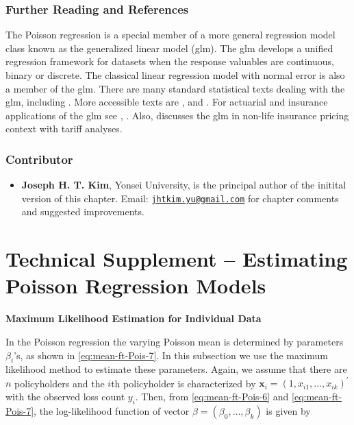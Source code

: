 \documentclass[]{book}
\providecommand{\tightlist}{%
  \setlength{\itemsep}{0pt}\setlength{\parskip}{0pt}}
\theoremstyle{definition}
\theoremstyle{definition}
\theoremstyle{definition}
\theoremstyle{remark}
\begin{document}
\subsubsection*{Further Reading and
References}\label{further-reading-and-references}

The Poisson regression is a special member of a more general regression
model class known as the generalized linear model (glm). The glm
develops a unified regression framework for datasets when the response
valuables are continuous, binary or discrete. The classical linear
regression model with normal error is also a member of the glm. There
are many standard statistical texts dealing with the glm, including
\citep{mccullagh1989generalized}. More accessible texts are
\citep{dobson2008introduction}, \citep{agresti1996introduction} and
\citep{faraway2016extending}. For actuarial and insurance applications
of the glm see \citep{frees2009regression}, \citep{de2008generalized}.
Also, \citep{ohlsson2010non} discusses the glm in non-life insurance
pricing context with tariff analyses.

\subsubsection*{Contributor}\label{contributor-1}

\begin{itemize}
\tightlist
\item
  \textbf{Joseph H. T. Kim}, Yonsei University, is the principal author
  of the initital version of this chapter. Email:
  \href{mailto:jhtkim.yu@gmail.com}{\nolinkurl{jhtkim.yu@gmail.com}} for
  chapter comments and suggested improvements.
\end{itemize}

\section{Technical Supplement -- Estimating Poisson Regression
Models}\label{S:RC:mle-Pois-reg}

\textbf{Maximum Likelihood Estimation for Individual Data}

In the Poisson regression the varying Poisson mean is determined by
parameters \(\beta_i\)'s, as shown in \eqref{eq:mean-ft-Pois-7}. In this
subsection we use the maximum likelihood method to estimate these
parameters. Again, we assume that there are \(n\) policyholders and the
\(i\)th policyholder is characterized by
\(\mathbf{ x}_i=(1, x_{i1}, \ldots, x_{ik})^{\prime}\) with the observed
loss count \(y_i\). Then, from \eqref{eq:mean-ft-Pois-6} and
\eqref{eq:mean-ft-Pois-7}, the log-likelihood function of vector
\(\beta=(\beta_0, \dots, \beta_k)\) is given by
\end{document}
